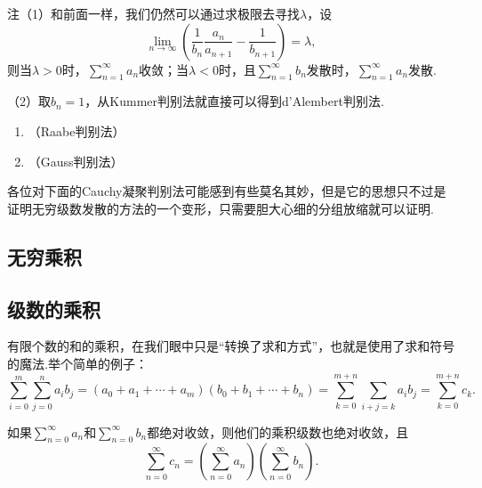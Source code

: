     {\heiti 注}（1）和前面一样，我们仍然可以通过求极限去寻找\(\lambda\)，设\[\lim\limits_{n\to\infty}\left(\frac{1}{b_n}\frac{a_n}{a_{n+1}}-\frac{1}{b_{n+1}}\right)=\lambda,\]则当\(\lambda>0\)时，\(\displaystyle\sum_{n=1}^{\infty}a_n\)收敛；当\(\lambda<0\)时，且\(\displaystyle\sum_{n=1}^{\infty}b_n\)发散时，\(\displaystyle\sum_{n=1}^{\infty}a_n\)发散.

    （2）取\(b_n=1\)，从Kummer判别法就直接可以得到d'Alembert判别法.
    \begin{corollary}
        \begin{enumerate}
            \item （Raabe判别法）
            \item （Gauss判别法）
        \end{enumerate}
    \end{corollary}

    各位对下面的Cauchy凝聚判别法可能感到有些莫名其妙，但是它的思想只不过是证明无穷级数发散的方法的一个变形，只需要胆大心细的分组放缩就可以证明.
    \begin{theorem}[Cauchy凝聚判别法]
        
    \end{theorem}
    \subsection{无穷乘积}
    \begin{definition}[无穷乘积]\label{def:数项级数:无穷乘积}
        
    \end{definition}

    \subsection{级数的乘积}
    有限个数的和的乘积，在我们眼中只是“转换了求和方式”，也就是使用了求和符号的魔法.举个简单的例子：\[\sum_{i=0}^{m}\sum_{j=0}^{n}a_ib_j=(a_0+a_1+\cdots+a_m)(b_0+b_1+\cdots+b_n)=\sum_{k=0}^{m+n}\sum_{i+j=k}a_ib_j=\sum_{k=0}^{m+n}c_k.\]
    \begin{definition}[Cauchy乘积]
        
    \end{definition}
    \begin{theorem}[Cauchy]\label{thm:数项级数:Cauchy定理}
        如果\(\sum\limits_{n=0}^{\infty}a_n\)和\(\sum\limits_{n=0}^{\infty}b_n\)都绝对收敛，则他们的乘积级数也绝对收敛，且\[\sum_{n=0}^{\infty}c_n=\left(\sum_{n=0}^{\infty}a_n\right)\left(\sum_{n=0}^{\infty}b_n\right).\]
    \end{theorem}


